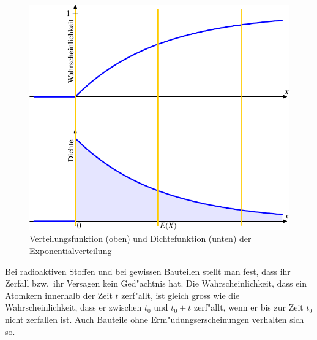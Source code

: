 \begin{figure}
\begin{center}
\includegraphics[width=0.8\hsize]{images/verteilungsfunktion-8}
\end{center}
\caption{Verteilungsfunktion (oben) und Dichtefunktion (unten) der
Exponentialverteilung
\label{bildexponentialverteilung}}
\end{figure}
Bei radioaktiven Stoffen und bei gewissen Bauteilen stellt man fest,
dass ihr Zerfall bzw.~ihr Versagen kein Ged"achtnis hat.
Die Wahrscheinlichkeit, dass ein Atomkern innerhalb der Zeit $t$ zerf"allt,
ist gleich gross wie die Wahrscheinlichkeit, dass er zwischen $t_0$
und $t_0+t$ zerf"allt, wenn er bis zur Zeit $t_0$ nicht zerfallen ist.
Auch Bauteile ohne Erm"udungserscheinungen verhalten sich so.

